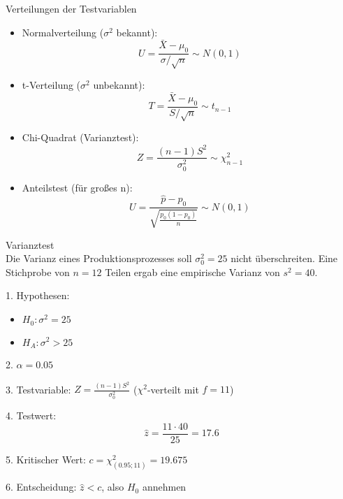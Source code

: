 \begin{theorem}{Verteilungen der Testvariablen}\\
\begin{itemize}
  \item Normalverteilung ($\sigma^2$ bekannt):
    $$U = \frac{\bar{X}-\mu_0}{\sigma/\sqrt{n}} \sim N(0,1)$$
  
  \item t-Verteilung ($\sigma^2$ unbekannt):
    $$T = \frac{\bar{X}-\mu_0}{S/\sqrt{n}} \sim t_{n-1}$$
  
  \item Chi-Quadrat (Varianztest):
    $$Z = \frac{(n-1)S^2}{\sigma_0^2} \sim \chi^2_{n-1}$$
  
  \item Anteilstest (für großes n):
    $$U = \frac{\hat{p}-p_0}{\sqrt{\frac{p_0(1-p_0)}{n}}} \sim N(0,1)$$
\end{itemize}
\end{theorem}

\begin{example2}{Varianztest}\\
Die Varianz eines Produktionsprozesses soll $\sigma_0^2 = 25$ nicht überschreiten. Eine Stichprobe von $n=12$ Teilen ergab eine empirische Varianz von $s^2 = 40$.

1. Hypothesen:
   \begin{itemize}
     \item $H_0: \sigma^2 = 25$
     \item $H_A: \sigma^2 > 25$
   \end{itemize}

2. $\alpha = 0.05$

3. Testvariable: $Z = \frac{(n-1)S^2}{\sigma_0^2}$ ($\chi^2$-verteilt mit $f=11$)

4. Testwert:
   $$\hat{z} = \frac{11 \cdot 40}{25} = 17.6$$

5. Kritischer Wert: $c = \chi^2_{(0.95;11)} = 19.675$

6. Entscheidung: $\hat{z} < c$, also $H_0$ annehmen
\end{example2}

